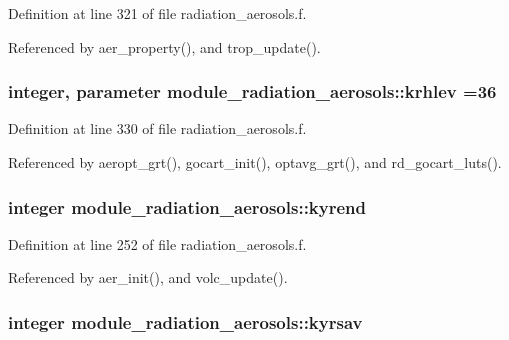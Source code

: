 Definition at line 321 of file radiation\+\_\+aerosols.\+f.



Referenced by aer\+\_\+property(), and trop\+\_\+update().

\subsubsection[{\texorpdfstring{krhlev}{krhlev}}]{\setlength{\rightskip}{0pt plus 5cm}integer, parameter module\+\_\+radiation\+\_\+aerosols\+::krhlev =36\hspace{0.3cm}{\ttfamily [private]}}\hypertarget{group__module__radiation__aerosols_ga33f2d4489a1730a27cbdc2e2add0f977}{}\label{group__module__radiation__aerosols_ga33f2d4489a1730a27cbdc2e2add0f977}


Definition at line 330 of file radiation\+\_\+aerosols.\+f.



Referenced by aeropt\+\_\+grt(), gocart\+\_\+init(), optavg\+\_\+grt(), and rd\+\_\+gocart\+\_\+luts().

\subsubsection[{\texorpdfstring{kyrend}{kyrend}}]{\setlength{\rightskip}{0pt plus 5cm}integer module\+\_\+radiation\+\_\+aerosols\+::kyrend\hspace{0.3cm}{\ttfamily [private]}}\hypertarget{group__module__radiation__aerosols_ga79127786cce93bccf8749ef8c85f6467}{}\label{group__module__radiation__aerosols_ga79127786cce93bccf8749ef8c85f6467}


Definition at line 252 of file radiation\+\_\+aerosols.\+f.



Referenced by aer\+\_\+init(), and volc\+\_\+update().

\subsubsection[{\texorpdfstring{kyrsav}{kyrsav}}]{\setlength{\rightskip}{0pt plus 5cm}integer module\+\_\+radiation\+\_\+aerosols\+::kyrsav\hspace{0.3cm}{\ttfamily [private]}}\hypertarget{group__module__radiation__aerosols_ga928c08857f866e4b848873a23a1d49e7}{}\label{group__module__radiation__aerosols_ga928c08857f866e4b848873a23a1d49e7}


